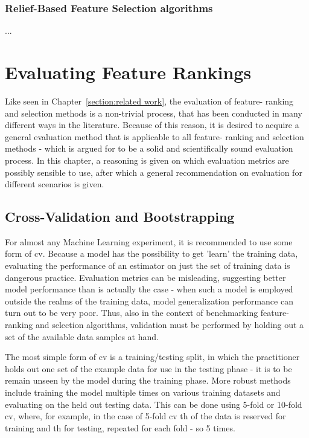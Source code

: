 \documentclass{article}
\begin{document}
\subsubsection{Relief-Based Feature Selection algorithms}
...

    
\section{Evaluating Feature Rankings}\label{section:evaluating feature rankings}
Like seen in Chapter~\ref{section:related work}, the evaluation of feature- ranking and selection methods is a non-trivial process, that has been conducted in many different ways in the literature. Because of this reason, it is desired to acquire a general evaluation method that is applicable to all feature- ranking and selection methods - which is argued for to be a solid and scientifically sound evaluation process. In this chapter, a reasoning is given on which evaluation metrics are possibly sensible to use, after which a general recommendation on evaluation for different scenarios is given.

\subsection{Cross-Validation and Bootstrapping}\label{section:cv}
For almost any Machine Learning experiment, it is recommended to use some form of \gls{cv}. Because a model has the possibility to get 'learn' the training data, evaluating the performance of an estimator on just the set of training data is dangerous practice. Evaluation metrics can be misleading, suggesting better model performance than is actually the case - when such a model is employed outside the realms of the training data, model generalization performance can turn out to be very poor. Thus, also in the context of benchmarking feature- ranking and selection algorithms, validation must be performed by holding out a set of the available data samples at hand.

The most simple form of \gls{cv} is a training/testing split, in which the practitioner holds out one set of the example data for use in the testing phase - it is to be remain unseen by the model during the training phase. More robust methods include training the model multiple times on various training datasets and evaluating on the held out testing data. This can be done using 5-fold or 10-fold \gls{cv}, where, for example, in the case of 5-fold \gls{cv} th of the data is reserved for training and th for testing, repeated for each fold - so 5 times.
\end{document}
